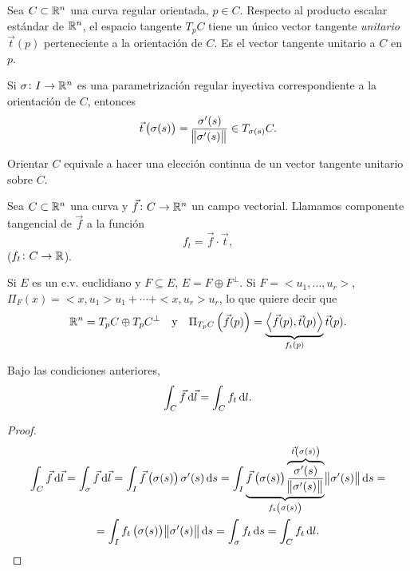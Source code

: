 \begin{prop}
    Sea $C \subset \mathbb{R}^n$ una curva regular orientada, $p \in C$. Respecto al producto escalar estándar de $\mathbb{R}^n$, el
    espacio tangente $T_pC$ tiene un único vector tangente \emph{unitario} $\vec{t}(p)$ perteneciente a la orientación de $C$. Es
    el vector tangente unitario a $C$ en $p$.

    Si $\sigma \colon I \to \mathbb{R}^n$ es una parametrización regular inyectiva correspondiente a la orientación de $C$, entonces
    \[
        \vec{t}\left( \sigma(s) \right) = \frac{\sigma^\prime(s)}{\norm{\sigma^\prime(s)}} \in T_{\sigma(s)}C.
    \]
\end{prop}
\begin{obs}
    Orientar $C$ equivale a hacer una elección continua de un vector tangente unitario sobre $C$.
\end{obs}

\begin{defi}
    Sea $C \subset \mathbb{R}^n$ una curva y $\vec{f} \colon C \to \mathbb{R}^n$ un campo vectorial. Llamamos componente tangencial de $\vec{f}$ a
    la función
    \[
        f_t = \vec{f} \cdot \vec{t},
    \]
    ($f_t \colon C \to \mathbb{R}$).
\end{defi}

\begin{obs}
    Si $E$ es un e.v. euclidiano y $F \subseteq E$, $E = F \oplus F^\perp$. Si $F = <u_1, \dots, u_r>$, $\Pi_F(x) = <x,u_1>u_1 + \cdots + <x,u_r>u_r$, lo
    que quiere decir que
    \[
        \mathbb{R}^n = T_pC \oplus T_pC^\perp \quad \text{y} \quad \Pi_{T_pC} \left( \vec{f}(p) \right) =\underbrace{\left< \vec{f}(p), \vec{t}(p) \right>}_{f_t(p)}\vec{t}(p).
    \]
\end{obs}

\begin{prop}
    Bajo las condiciones anteriores,
    \[
        \int_C \vec{f} \dif \vec{l} = \int_C f_t \dif l.
    \]
\end{prop}

\begin{proof}
    \begin{gather*}
        \int_C \vec{f} \dif \vec{l} = \int_\sigma \vec{f} \dif \vec{l} = \int_I \vec{f}\left( \sigma(s) \right)\sigma^\prime(s) \dif s =
        \int_I \underbrace{\vec{f}\left( \sigma(s) \right) \overbrace{\frac{\sigma^\prime(s)}{\norm{\sigma^\prime(s)}}}^{\vec{t}\left( \sigma(s) \right)}}_
        {f_t\left( \sigma(s) \right)} \norm{\sigma^\prime(s)} \dif s = \\ = \int_I f_t\left( \sigma(s) \right) \norm{\sigma^\prime(s)} \dif s =
        \int_\sigma f_t \dif s = \int_C f_t \dif l.
    \end{gather*}
\end{proof}

